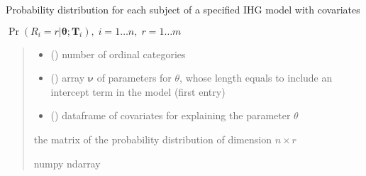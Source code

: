 \documentclass[letterpaper,10pt,english]{sphinxmanual}
\begin{document}

\begin{fulllineitems}
\label{\detokenize{cubmods:cubmods.ihg_v.pmfi}}
\pysigstartsignatures
{}
\pysigstopsignatures
\sphinxAtStartPar
Probability distribution for each subject of a specified IHG model with covariates

\sphinxAtStartPar
\(\Pr(R_i=r|\pmb\theta; \pmb T_i),\; i=1 \ldots n ,\; r=1 \ldots m\)
\begin{quote}\begin{description}
\begin{itemize}
\item {} 
\sphinxAtStartPar
{} () \textendash{} number of ordinal categories

\item {} 
\sphinxAtStartPar
{} () \textendash{} array \(\pmb \nu\) of parameters for \(\theta\), whose length equals 
 to include an intercept term in the model (first entry)

\item {} 
\sphinxAtStartPar
{} () \textendash{} dataframe of covariates for explaining the parameter \(\theta\)

\end{itemize}

\sphinxAtStartPar
the matrix of the probability distribution of dimension \(n \times r\)

\sphinxAtStartPar
numpy ndarray

\end{description}\end{quote}

\end{fulllineitems}

\end{document}
